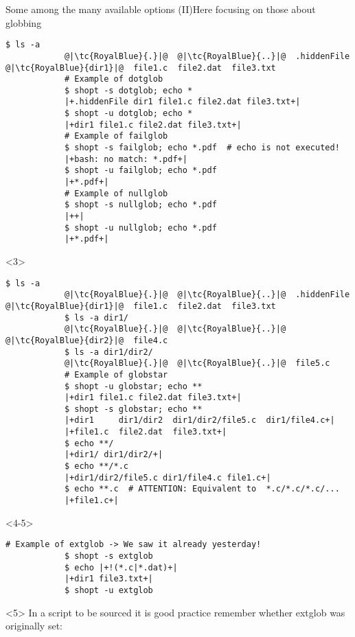 \begin{frame}[fragile]{Some among the many available options (II)}{Here focusing on those about globbing}
\begin{onlyenv}
\begin{lstlisting}[style=myBash]
            $ ls -a
            @|\tc{RoyalBlue}{.}|@  @|\tc{RoyalBlue}{..}|@  .hiddenFile  @|\tc{RoyalBlue}{dir1}|@  file1.c  file2.dat  file3.txt
            # Example of dotglob
            $ shopt -s dotglob; echo *
            |+.hiddenFile dir1 file1.c file2.dat file3.txt+|
            $ shopt -u dotglob; echo *
            |+dir1 file1.c file2.dat file3.txt+|
            # Example of failglob
            $ shopt -s failglob; echo *.pdf  # echo is not executed!
            |+bash: no match: *.pdf+|
            $ shopt -u failglob; echo *.pdf
            |+*.pdf+|
            # Example of nullglob
            $ shopt -s nullglob; echo *.pdf
            |++|
            $ shopt -u nullglob; echo *.pdf
            |+*.pdf+|
        \end{lstlisting}
    \end{onlyenv}
    \begin{onlyenv}<3>
        \begin{lstlisting}[style=myBash, firstnumber=18]
            $ ls -a
            @|\tc{RoyalBlue}{.}|@  @|\tc{RoyalBlue}{..}|@  .hiddenFile  @|\tc{RoyalBlue}{dir1}|@  file1.c  file2.dat  file3.txt
            $ ls -a dir1/
            @|\tc{RoyalBlue}{.}|@  @|\tc{RoyalBlue}{..}|@  @|\tc{RoyalBlue}{dir2}|@  file4.c
            $ ls -a dir1/dir2/
            @|\tc{RoyalBlue}{.}|@  @|\tc{RoyalBlue}{..}|@  file5.c
            # Example of globstar
            $ shopt -u globstar; echo **
            |+dir1 file1.c file2.dat file3.txt+|
            $ shopt -s globstar; echo **
            |+dir1     dir1/dir2  dir1/dir2/file5.c  dir1/file4.c+|
            |+file1.c  file2.dat  file3.txt+|
            $ echo **/
            |+dir1/ dir1/dir2/+|
            $ echo **/*.c
            |+dir1/dir2/file5.c dir1/file4.c file1.c+|
            $ echo **.c  # ATTENTION: Equivalent to  *.c/*.c/*.c/...
            |+file1.c+|
        \end{lstlisting}
    \end{onlyenv}
    \begin{onlyenv}<4-5>
        \begin{lstlisting}[style=myBash, belowskip=-5mm, firstnumber=36]
            # Example of extglob -> We saw it already yesterday!
            $ shopt -s extglob
            $ echo |+!(*.c|*.dat)+|
            |+dir1 file3.txt+|
            $ shopt -u extglob
        \end{lstlisting}
        \begin{uncoverenv}<5>
            In a script to be sourced it is good practice remember whether extglob was originally set:

\end{uncoverenv}
\end{onlyenv}
\end{frame}
